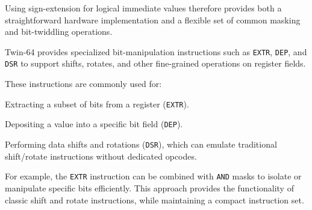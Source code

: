 Using sign-extension for logical immediate values therefore provides both a straightforward hardware implementation and a flexible set of common masking and bit-twiddling operations.


Twin-64 provides specialized bit-manipulation instructions such as \texttt{EXTR}, \texttt{DEP}, and \texttt{DSR} to support shifts, rotates, and other fine-grained operations on register fields. 

These instructions are commonly used for:

\begin{smallGapItemize}
    \item Extracting a subset of bits from a register (\texttt{EXTR}).
    \item Depositing a value into a specific bit field (\texttt{DEP}).
    \item Performing data shifts and rotations (\texttt{DSR}), which can emulate 
          traditional shift/rotate instructions without dedicated opcodes.
\end{smallGapItemize}

For example, the \texttt{EXTR} instruction can be combined with \texttt{AND} masks to isolate or manipulate specific bits efficiently. This approach provides the functionality of classic shift and rotate instructions, while maintaining a compact instruction set.




